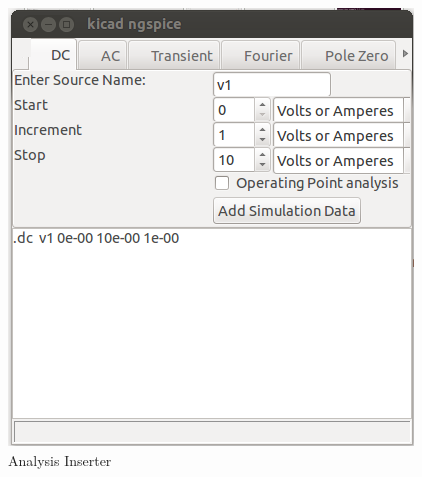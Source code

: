 \begin{figure}%
\begin{center}
\includegraphics[width=1\linewidth]{figures/apd38.png}%
\caption{Analysis Inserter}
\label{38}
\end{center}
\end{figure}
